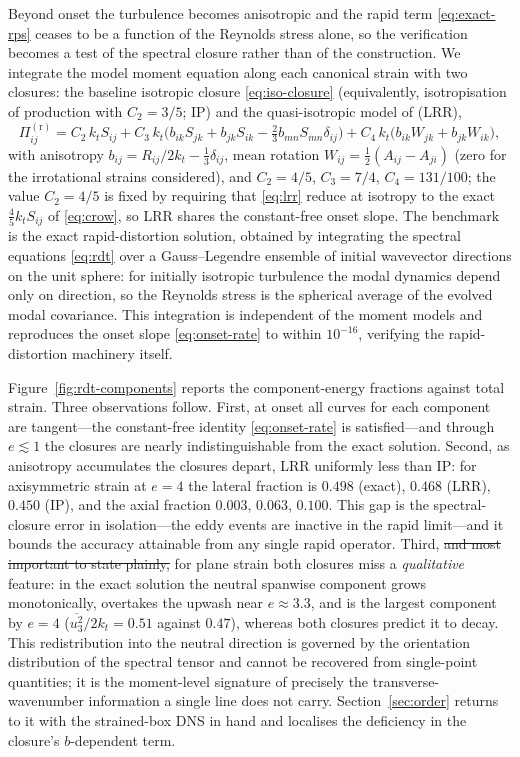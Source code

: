 \documentclass[lineno]{JFM-FLM_Au}
\providecommand{\DIFdel}[1]{{\protect\color{red}\sout{#1}}} %
\providecommand{\DIFdelbegin}{} %
\providecommand{\DIFdelend}{} %
\begin{document}
Beyond onset the turbulence becomes anisotropic and the rapid term
\eqref{eq:exact-rps} ceases to be a function of the Reynolds stress
alone, so the verification becomes a test of the spectral closure rather
than of the construction. We integrate the model moment equation along
each canonical strain with two closures: the baseline isotropic closure
\eqref{eq:iso-closure} (equivalently, isotropisation of production with
$C_2=3/5$; IP) and the quasi-isotropic model of
\citet{LaunderReeceRodi1975} (LRR),
\begin{equation}
  \Pi^{(\mathrm r)}_{ij} = C_2\,k_t S_{ij}
  + C_3\,k_t\big(b_{ik}S_{jk}+b_{jk}S_{ik}
  -\tfrac{2}{3}b_{mn}S_{mn}\delta_{ij}\big)
  + C_4\,k_t\big(b_{ik}W_{jk}+b_{jk}W_{ik}\big),
  \label{eq:lrr}
\end{equation}
with anisotropy $b_{ij}=R_{ij}/2k_t-\tfrac13\delta_{ij}$, mean rotation
$W_{ij}=\tfrac12(A_{ij}-A_{ji})$ (zero for the irrotational strains
considered), and $C_2=4/5$, $C_3=7/4$, $C_4=131/100$; the value
$C_2=4/5$ is fixed by requiring that \eqref{eq:lrr} reduce at isotropy to
the exact $\tfrac45k_tS_{ij}$ of \eqref{eq:crow}, so LRR shares the
constant-free onset slope. The benchmark is the exact rapid-distortion
solution, obtained by integrating the spectral equations \eqref{eq:rdt}
over a Gauss--Legendre ensemble of initial wavevector directions on the
unit sphere: for initially isotropic turbulence the modal dynamics depend
only on direction, so the Reynolds stress is the spherical average of the
evolved modal covariance. This integration is independent of the moment
models and reproduces the onset slope \eqref{eq:onset-rate} to within
$10^{-16}$, verifying the rapid-distortion machinery itself.

Figure~\ref{fig:rdt-components} reports the component-energy fractions
against total strain. Three observations follow. First, at onset all
curves for each component are tangent---the constant-free identity
\eqref{eq:onset-rate} is satisfied---and through $e\lesssim1$ the
closures are nearly indistinguishable from the exact solution. Second,
as anisotropy accumulates the closures depart, LRR uniformly less than
IP: for axisymmetric strain at $e=4$ the lateral fraction is $0.498$
(exact), $0.468$ (LRR), $0.450$ (IP), and the axial fraction $0.003$,
$0.063$, $0.100$. This gap is the spectral-closure error in
isolation---the eddy events are inactive in the rapid limit---and it
bounds the accuracy attainable from any single rapid operator. Third, \DIFdelbegin \DIFdel{and most important to state plainly, }\DIFdelend for plane strain both closures miss
a \emph{qualitative} feature: in the exact solution the neutral spanwise
component grows monotonically, overtakes the upwash near $e\approx3.3$,
and is the largest component by $e=4$
($\overline{u_3^2}/2k_t=0.51$ against $0.47$), whereas both closures
predict it to decay. This redistribution into the neutral direction is
governed by the orientation distribution of the spectral tensor and
cannot be recovered from single-point quantities; it is the moment-level
signature of precisely the transverse-wavenumber information a single
line does not carry. Section~\ref{sec:order} returns to it with the
strained-box DNS in hand and localises the deficiency in the closure's
$b$-dependent term.
\end{document}

